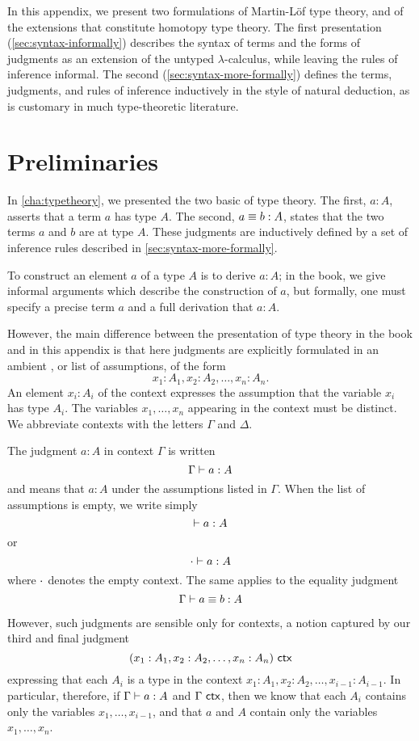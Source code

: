 In this appendix, we present two formulations of Martin-L\"{o}f type
theory, and of the extensions that constitute homotopy type theory.
The first presentation (\autoref{sec:syntax-informally}) describes the syntax of
terms and the forms of judgments as an extension of the untyped
$\lambda$-calculus, while leaving the rules of inference informal.
The second (\autoref{sec:syntax-more-formally}) defines the terms, judgments,
and rules of inference inductively in the style of natural deduction, as
is customary in much type-theoretic literature.

\section*{Preliminaries}
\label{sec:formal-prelim}


In \autoref{cha:typetheory}, we presented the two basic 
of type theory. The first, $a:A$, asserts that a term $a$ has type $A$. The second,
$a\equiv b:A$, states that the two terms $a$ and $b$ are 
at type $A$. These judgments are inductively defined by a set of
inference rules described in \autoref{sec:syntax-more-formally}.

To construct an element $a$ of a type $A$ is to derive $a:A$; in the book, we
give informal arguments which describe the construction of $a$, but formally,
one must specify a precise term $a$ and a full derivation that $a:A$.

However, the main difference between the presentation of type theory in the book
and in this appendix is that here judgments are explicitly
formulated in an ambient ,
or list of assumptions, of the form
\[
  x_1:A_1, x_2:A_2,\dots,x_n:A_n.
\]
An element $x_i : A_i$ of the context expresses the assumption that the
variable
%
$x_i$ has type $A_i$. The variables $x_1, \ldots, x_n$ appearing in
the context must be distinct. We abbreviate contexts with the letters $\Gamma$
and $\Delta$.

The judgment $a:A$ in context $\Gamma$ is written 
\[ \Gamma \vdash a : A \]
and means that $a:A$ under the assumptions listed in $\Gamma$. When the list of
assumptions is empty, we write simply
\[ \vdash a : A \]
or
\[ \cdot \vdash a : A \]
where $\cdot$ denotes the empty context. The same applies to the equality
judgment
\[
  \Gamma \vdash a \equiv b : A
\]

However, such judgments are sensible only for  contexts,
%
a notion captured by our third and final judgment
\[
  (x_1:A_1, x_2:A_2,\dots,x_n:A_n)\ \mathsf{ctx}
\]
expressing that each $A_i$ is a type in the context $x_1:A_1,
x_2:A_2,\dots,x_{i-1}:A_{i-1}$.  In particular, therefore, if $\Gamma \vdash a : A$ and
$\Gamma\ \mathsf{ctx}$, then we know that each $A_i$ contains only the variables
$x_1,\dots,x_{i-1}$, and that $a$ and $A$ contain only the variables
$x_1,\dots,x_n$.

